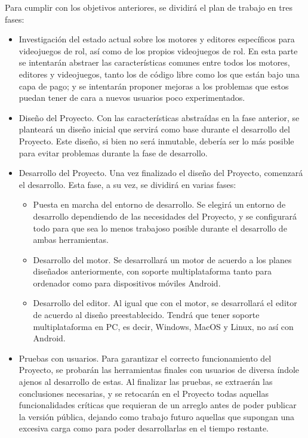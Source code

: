 Para cumplir con los objetivos anteriores, se dividirá el plan de trabajo en tres fases:
\begin{itemize}
	\item Investigación del estado actual sobre los motores y editores específicos para videojuegos de rol, así como de los propios videojuegos de rol. En esta parte se intentarán abstraer las características comunes entre todos los motores, editores y videojuegos, tanto los de código libre como los que están bajo una capa de pago; y se intentarán proponer mejoras a los problemas que estos puedan tener de cara a nuevos usuarios poco experimentados.
	\item Diseño del Proyecto. Con las características abstraídas en la fase anterior, se planteará un diseño inicial que servirá como base durante el desarrollo del Proyecto. Este diseño, si bien no será inmutable, debería ser lo más  posible para evitar problemas durante la fase de desarrollo.
	\item Desarrollo del Proyecto. Una vez finalizado el diseño del Proyecto, comenzará el desarrollo. Esta fase, a su vez, se dividirá en varias fases:
		\begin{itemize}
			\item Puesta en marcha del entorno de desarrollo. Se elegirá un entorno de desarrollo dependiendo de las necesidades del Proyecto, y se configurará todo para que sea lo menos trabajoso posible durante el desarrollo de ambas herramientas. 
			\item Desarrollo del motor. Se desarrollará un motor de acuerdo a los planes diseñados anteriormente, con soporte multiplataforma tanto para ordenador como para dispositivos móviles Android.
			\item Desarrollo del editor. Al igual que con el motor, se desarrollará el editor de acuerdo al diseño preestablecido. Tendrá que tener soporte multiplataforma en PC, es decir, Windows, MacOS y Linux, no así con Android.
		\end{itemize}
	\item Pruebas con usuarios. Para garantizar el correcto funcionamiento del Proyecto, se probarán las herramientas finales con usuarios de diversa índole ajenos al desarrollo de estas. Al finalizar las pruebas, se extraerán las conclusiones necesarias, y se retocarán en el Proyecto todas aquellas funcionalidades críticas que requieran de un arreglo antes de poder publicar la versión pública, dejando como trabajo futuro aquellas que supongan una excesiva carga como para poder desarrollarlas en el tiempo restante.
\end{itemize}


